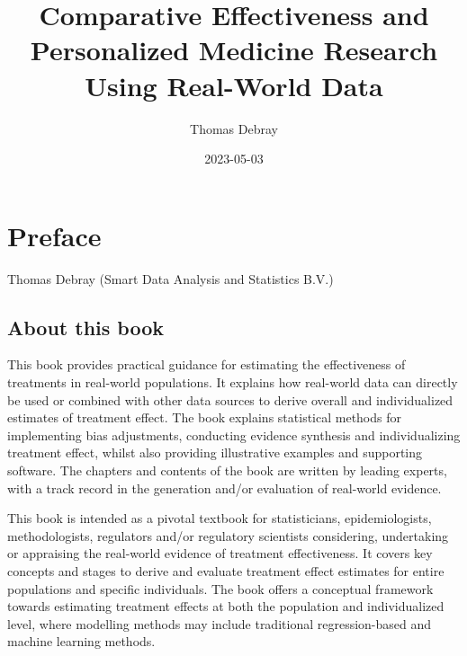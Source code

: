 \documentclass[
  letterpaper,
  DIV=11,
  numbers=noendperiod]{scrreprt}
\title{Comparative Effectiveness and Personalized Medicine Research
Using Real-World Data}
\author{Thomas Debray}
\date{2023-05-03}
\renewcommand*\contentsname{Table of contents}
\newcommand\contentsname{Table of contents}
\begin{document}
\maketitle
\ifdefined\Shaded\renewenvironment{Shaded}{\begin{tcolorbox}[interior hidden, sharp corners, borderline west={3pt}{0pt}{shadecolor}, boxrule=0pt, breakable, enhanced, frame hidden]}{\end{tcolorbox}}\fi

\renewcommand*\contentsname{Table of contents}
{
\hypersetup{linkcolor=}
\setcounter{tocdepth}{2}
\tableofcontents
}

\hypertarget{preface}{%
\chapter{Preface}\label{preface}}

Thomas Debray (Smart Data Analysis and Statistics B.V.)

\hfill\break

\hypertarget{about-this-book}{%
\section*{About this book}\label{about-this-book}}


This book provides practical guidance for estimating the effectiveness
of treatments in real-world populations. It explains how real-world data
can directly be used or combined with other data sources to derive
overall and individualized estimates of treatment effect. The book
explains statistical methods for implementing bias adjustments,
conducting evidence synthesis and individualizing treatment effect,
whilst also providing illustrative examples and supporting software. The
chapters and contents of the book are written by leading experts, with a
track record in the generation and/or evaluation of real-world evidence.

This book is intended as a pivotal textbook for statisticians,
epidemiologists, methodologists, regulators and/or regulatory scientists
considering, undertaking or appraising the real-world evidence of
treatment effectiveness. It covers key concepts and stages to derive and
evaluate treatment effect estimates for entire populations and specific
individuals. The book offers a conceptual framework towards estimating
treatment effects at both the population and individualized level, where
modelling methods may include traditional regression-based and machine
learning methods.
\end{document}
